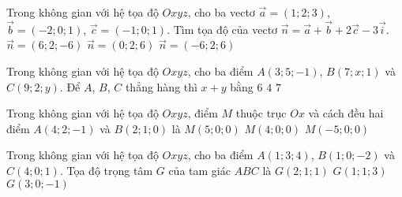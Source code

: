 \begin{ex}%
Trong không gian với hệ tọa độ $Oxyz$, cho ba vectơ $\overrightarrow{a}=(1; 2; 3)$, $\overrightarrow{b}=(-2; 0; 1)$,  $\overrightarrow{c}=(-1; 0; 1)$. Tìm tọa độ của vectơ $\overrightarrow{n}=\overrightarrow{a}+\overrightarrow{b}+2\overrightarrow{c}-3\overrightarrow{i}$.
 {$\overrightarrow{n}=(6; 2; -6)$}
 {$\overrightarrow{n}=(0; 2; 6)$}
 {\True $\overrightarrow{n}=(-6; 2; 6)$}
\end{ex}

\begin{ex}%
Trong không gian với hệ tọa độ $Oxyz$, cho ba điểm $A(3; 5; -1)$, $B(7; x; 1)$ và $C(9; 2; y)$. Để $A$, $B$, $C$ thẳng hàng thì $x+y$ bằng
 {$6$}
 {$4$}
 {$7$}
\end{ex}

\begin{ex}%
Trong không gian với hệ tọa độ $Oxyz$, điểm $M$ thuộc trục $Ox$ và cách đều hai điểm $A(4; 2; -1)$ và $B(2; 1; 0)$ là
 {$M(5; 0; 0)$}
 {\True $M(4; 0; 0)$}
 {$M(-5; 0; 0)$}
\end{ex}

\begin{ex}%
Trong không gian với hệ tọa độ $Oxyz$, cho ba điểm $A(1; 3; 4)$, $B(1; 0; -2)$ và $C(4; 0; 1)$. Tọa độ trọng tâm $G$ của tam giác $ABC$ là
 {\True $G(2; 1; 1)$}
 {$G(1; 1; 3)$}
 {$G(3; 0; -1)$}
\end{ex}

